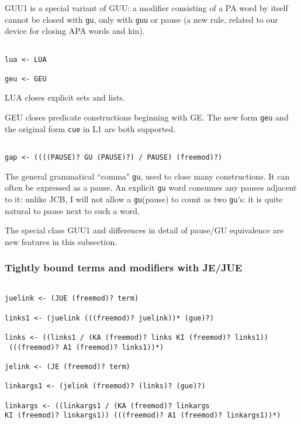 \documentclass[12pt]{article}
\begin{document}
GUU1 is a special variant of GUU:  a modifier consisting of a PA word by itself cannot be closed with {\tt gu}, only with
{\tt guu} or pause (a new rule, related to our device for closing APA words and kin).

\begin{verbatim}

lua <- LUA

geu <- GEU

\end{verbatim}

LUA closes explicit sets and lists.

GEU closes predicate constructions beginning with GE.  The new form {\tt geu} and the original form {\tt cue} in L1 are both supported.

\begin{verbatim}

gap <- ((((PAUSE)? GU (PAUSE)?) / PAUSE) (freemod)?)

\end{verbatim}

The general grammatical ``comma" {\tt gu}, used to close many constructions.  It can often be expressed as a pause.
An explicit {\tt gu} word consumes any pauses adjacent to it:  unlike JCB, I will not allow a {\tt gu}(pause) to count as two {\tt gu}'s:  it is quite natural to pause next to such a word.

The special class GUU1 and differences in detail of pause/GU equivalence are new features in this subsection.

\subsubsection{Tightly bound terms and modifiers with JE/JUE}

\begin{verbatim}

juelink <- (JUE (freemod)? term)

links1 <- (juelink (((freemod)? juelink))* (gue)?)

links <- ((links1 / (KA (freemod)? links KI (freemod)? links1))
 (((freemod)? A1 (freemod)? links1))*)

jelink <- (JE (freemod)? term)

linkargs1 <- (jelink (freemod)? (links)? (gue)?)

linkargs <- ((linkargs1 / (KA (freemod)? linkargs 
KI (freemod)? linkargs1)) (((freemod)? A1 (freemod)? linkargs1))*)

\end{verbatim}
\end{document}
